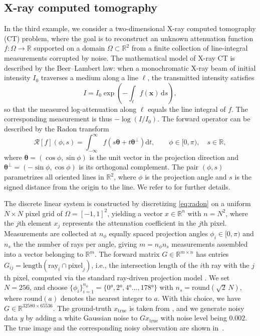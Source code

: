 \documentclass[]{myarticle}
\begin{document}
\subsection{X-ray computed tomography}
In the third example, we consider a two-dimensional X-ray computed tomography (CT) problem, where the goal is to reconstruct an unknown attenuation function $f: \Omega \to \mathbb{R}$ supported on a domain $\Omega \subset \mathbb{R}^2$ from a finite collection of line-integral measurements corrupted by noise. The mathematical model of X-ray CT is described by the Beer--Lambert law: when a 
monochromatic X-ray beam of initial intensity $I_0$ traverses a medium along a line $\ell$, the transmitted intensity satisfies
\begin{equation}
    I = I_0 \exp\!\left( -\int_{\ell} f(\boldsymbol{x})\, \mathrm{d}s \right),
\end{equation}
so that the measured log-attenuation along $\ell$ equals the line integral of $f$. The corresponding measurement is thus $-\log(I/I_0)$. The forward operator can be described by the Radon transform
\begin{equation}\label{eq:radon}
  \mathcal{R}[f](\phi, s) 
   = \int_{-\infty}^{\infty} f\!\left( s \boldsymbol{\theta} + t \boldsymbol{\theta}^\perp \right) \mathrm{d}t, 
   \qquad \phi \in [0, \pi),\quad s \in \mathbb{R}, 
\end{equation}
where $\boldsymbol{\theta} = (\cos\phi, \sin\phi)$ is the unit vector in the projection direction and $\boldsymbol{\theta}^\perp = (-\sin\phi, \cos\phi)$ is its orthogonal complement. The pair $(\phi,s)$ parametrizes all oriented lines in $\mathbb{R}^2$, where $\phi$ is the projection angle and $s$ is the signed distance from the origin to the line. We refer to \cite{Buzug2008,natterer2001mathematics} for further details.

The discrete linear system is constructed by discretizing \cref{eq:radon} on a uniform $N \times N$ pixel grid of $\Omega=[-1,1]^2$, yielding a vector $x \in \mathbb{R}^n$ with $n = N^2$, where the $j$th element $x_j$ represents the attenuation coefficient in the $j$th pixel. Measurements are collected at $n_\phi$ equally spaced projection angles $\phi_i \in [0, \pi)$ and $n_s$ the the number of rays per angle, giving $m = n_\phi n_s$ measurements assembled into a vector belonging to $\mathbb{R}^m$. The forward matrix $G \in \mathbb{R}^{m \times n}$ has entries $G_{ij} = \mathrm{length}\!\left( \mathrm{ray}_i \cap \mathrm{pixel}_j \right)$, i.e., the intersection length of the $i$th ray with the $j$th pixel, computed via the standard ray-driven projection model \cite{natterer2001mathematics}. We set $N=256$, and choose $\{\phi_i\}_{i=1}^{n_\phi} = \{\ang{0},\ang{2}, \ang{4} \dots, \ang{178}\}$ with $n_s = \mathrm{round}(\sqrt{2}\,N)$, where $\mathrm{round}(a)$ denotes the nearest integer to $a$. With this choice, we have $G\in\mathbb{R}^{32580 \times 65536}$. The ground-truth $x_{\mathrm{true}}$ is taken from \cite{Gazzola2019}, and we generate noisy data $y$ by adding a white Gaussian noise to $Gx_{\mathrm{true}}$ with noise level being $0.002$. The true image and the corresponding noisy observation are shown in~.
\end{document}
